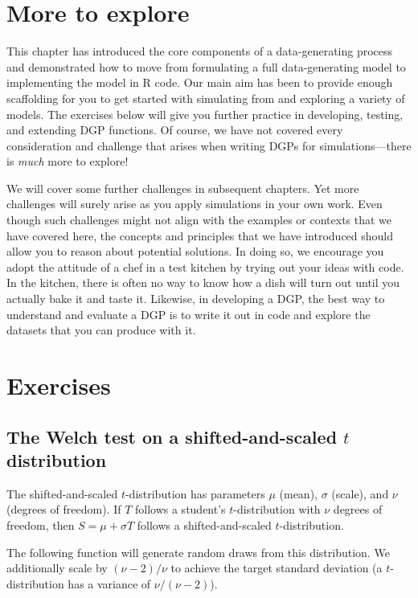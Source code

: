 \documentclass[
]{book}
\begin{document}
\section{More to explore}\label{more-to-explore}

This chapter has introduced the core components of a data-generating process and demonstrated how to move from formulating a full data-generating model to implementing the model in R code.
Our main aim has been to provide enough scaffolding for you to get started with simulating from and exploring a variety of models.
The exercises below will give you further practice in developing, testing, and extending DGP functions.
Of course, we have not covered every consideration and challenge that arises when writing DGPs for simulations---there is \emph{much} more to explore!

We will cover some further challenges in subsequent chapters.
Yet more challenges will surely arise as you apply simulations in your own work.
Even though such challenges might not align with the examples or contexts that we have covered here, the concepts and principles that we have introduced should allow you to reason about potential solutions.
In doing so, we encourage you adopt the attitude of a chef in a test kitchen by trying out your ideas with code.
In the kitchen, there is often no way to know how a dish will turn out until you actually bake it and taste it.
Likewise, in developing a DGP, the best way to understand and evaluate a DGP is to write it out in code and explore the datasets that you can produce with it.

\section{Exercises}\label{exercises-3}

\subsection{\texorpdfstring{The Welch test on a shifted-and-scaled \(t\) distribution}{The Welch test on a shifted-and-scaled t distribution}}\label{Welch-t-dgp}

The shifted-and-scaled \(t\)-distribution has parameters \(\mu\) (mean), \(\sigma\) (scale), and \(\nu\) (degrees of freedom).
If \(T\) follows a student's \(t\)-distribution with \(\nu\) degrees of freedom, then \(S = \mu + \sigma T\) follows a shifted-and-scaled \(t\)-distribution.

The following function will generate random draws from this distribution.
We additionally scale by \((\nu-2)/\nu\) to achieve the target standard deviation (a \(t\)-distribution has a variance of \(\nu/(\nu-2)\)).
\end{document}
